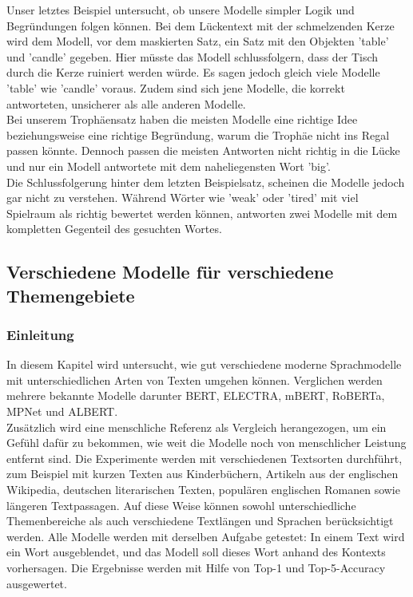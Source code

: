 \documentclass[a4paper, 11pt]{article}          %
\begin{document}
Unser letztes Beispiel untersucht, ob unsere Modelle simpler Logik und Begründungen folgen können.
Bei dem Lückentext mit der schmelzenden Kerze wird dem Modell, vor dem maskierten Satz, ein Satz mit den Objekten 'table' und  'candle' gegeben.
Hier müsste das Modell schlussfolgern, dass der Tisch durch die Kerze ruiniert werden würde.
Es sagen jedoch gleich viele Modelle 'table' wie 'candle' voraus. Zudem sind sich jene Modelle, die korrekt antworteten, unsicherer als alle anderen Modelle.\\
Bei unserem Trophäensatz haben die meisten Modelle eine richtige Idee beziehungsweise eine richtige Begründung, warum die Trophäe nicht ins Regal passen könnte.
Dennoch passen die meisten Antworten nicht richtig in die Lücke und nur ein Modell antwortete mit dem naheliegensten Wort 'big'.\\
Die Schlussfolgerung hinter dem letzten Beispielsatz, scheinen die Modelle jedoch gar nicht zu verstehen.
Während Wörter wie 'weak' oder 'tired' mit viel Spielraum als richtig bewertet werden können, antworten zwei Modelle mit dem kompletten Gegenteil des gesuchten Wortes.

\newpage
\subsection{Verschiedene Modelle für verschiedene Themengebiete}
\label{sub:model_comparison}

\subsubsection{Einleitung} 
In diesem Kapitel wird untersucht, wie gut verschiedene moderne Sprachmodelle mit unterschiedlichen Arten von Texten umgehen können.
Verglichen werden mehrere bekannte Modelle darunter BERT, ELECTRA, mBERT, RoBERTa, MPNet und ALBERT.\\
Zusätzlich wird eine menschliche Referenz als Vergleich herangezogen, um ein Gefühl dafür zu bekommen, wie weit die Modelle noch von menschlicher Leistung entfernt sind. 
Die Experimente werden mit verschiedenen Textsorten durchführt, zum Beispiel mit kurzen Texten aus Kinderbüchern, 
Artikeln aus der englischen Wikipedia, deutschen literarischen Texten, populären englischen Romanen sowie längeren Textpassagen. Auf diese Weise können sowohl unterschiedliche Themenbereiche als auch verschiedene Textlängen und Sprachen berücksichtigt werden. 
Alle Modelle werden mit derselben Aufgabe getestet: In einem Text wird ein Wort ausgeblendet, und das Modell soll dieses Wort anhand des Kontexts vorhersagen. Die Ergebnisse werden mit Hilfe von Top-1 und Top-5-Accuracy ausgewertet. 
\end{document}

